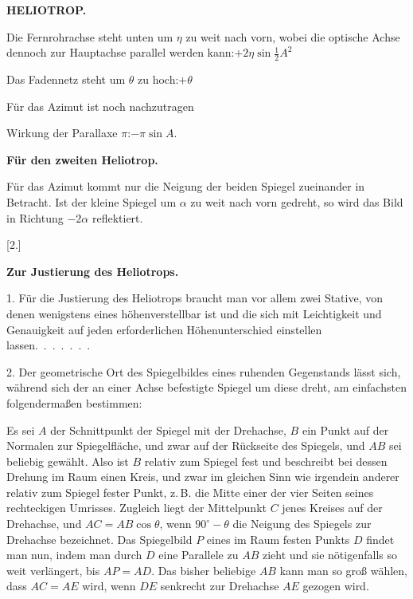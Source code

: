 \clearpage
\noindent\null\hfill{\small\textbf{HELIOTROP.}}\hfill{}\par\medskip
\begin{list}{}{\setlength{\leftmargin}{9mm}\setlength{\labelwidth}{6mm}\setlength{\itemsep}{2pt}\setlength{\parsep}{0pt}\setlength{\topsep}{0pt}}
\item[7.] Die Fernrohrachse steht unten um $\eta$ zu weit nach vorn,
wobei die optische Achse dennoch zur Hauptachse
parallel werden kann:\hfill $+2\eta\sin\frac12 A^2$
\item[8.] Das Fadennetz steht um $\theta$ zu hoch:\hfill $+\theta$
\end{list}
\noindent Für das Azimut ist noch nachzutragen\par
\hspace*{9mm}Wirkung der Parallaxe $\pi$:\hfill $-\pi\sin A.$
\begin{center}\textbf{Für den zweiten Heliotrop.}\end{center}
Für das Azimut kommt nur die Neigung der beiden Spiegel zueinander in
Betracht. Ist der kleine Spiegel um $\alpha$ zu weit nach vorn gedreht, so
wird das Bild in Richtung $-2\alpha$ reflektiert.
\begin{center}
[2.]\par\medskip
\textbf{Zur Justierung des Heliotrops.}
\end{center}
1. Für die Justierung des Heliotrops braucht man vor allem zwei Stative,
von denen wenigstens eines höhenverstellbar ist und die sich mit Leichtigkeit
und Genauigkeit auf jeden erforderlichen Höhenunterschied einstellen lassen.\ .\ .\ .\ .\ .\ .

2. Der geometrische Ort des Spiegelbildes eines ruhenden Gegenstands lässt
sich, während sich der an einer Achse befestigte Spiegel um diese dreht,
am einfachsten folgendermaßen bestimmen:

Es sei $A$ der Schnittpunkt der Spiegel mit der Drehachse, $B$ ein
Punkt auf der Normalen zur Spiegelfläche, und zwar auf der Rückseite des
Spiegels, und $AB$ sei beliebig gewählt. Also ist $B$ relativ zum Spiegel
fest und beschreibt bei dessen Drehung im Raum einen Kreis, und zwar im
gleichen Sinn wie irgendein anderer relativ zum Spiegel fester Punkt, z.\,B.
die Mitte einer der vier Seiten seines rechteckigen Umrisses. Zugleich liegt
der Mittelpunkt $C$ jenes Kreises auf der Drehachse, und $AC=AB\cos\theta$,
wenn $90^\circ-\theta$ die Neigung des Spiegels zur Drehachse bezeichnet.
Das Spiegelbild $P$ eines im Raum festen Punkts $D$ findet man nun, indem
man durch $D$ eine Parallele zu $AB$ zieht und sie nötigenfalls so weit
verlängert, bis $AP=AD$. Das bisher beliebige $AB$ kann man so groß wählen,
dass $AC=AE$ wird, wenn $DE$ senkrecht zur Drehachse $AE$ gezogen wird.

